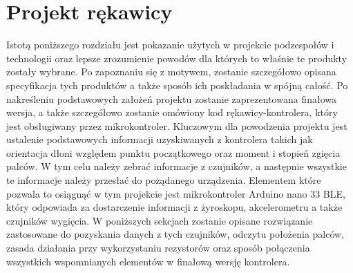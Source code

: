 \chapter{Projekt rękawicy}
\label{ch:projekt}
Istotą poniższego rozdziału jest pokazanie użytych w projekcie podzespołów i technologii oraz lepsze zrozumienie powodów dla których to właśnie te produkty zostały wybrane. Po zapoznaniu się z motywem, zostanie szczegółowo opisana specyfikacja tych produktów a także sposób ich poskładania w spójną całość. Po nakreśleniu podstawowych założeń projektu zostanie zaprezentowana finałowa wersja, a także szczegółowo zostanie omówiony kod rękawicy-kontrolera, który jest obsługiwany przez mikrokontroler. Kluczowym dla powodzenia projektu jest ustalenie podstawowych informacji uzyskiwanych z kontrolera takich jak orientacja dłoni względem punktu początkowego oraz moment i stopień zgięcia palców. W tym celu należy zebrać informacje z czujników, a następnie wszystkie te informacje należy przesłać do pożądanego urządzenia. Elementem które pozwala to osiągnąć w tym projekcie jest mikrokontroler Arduino nano 33 BLE, który odpowiada za dostarczenie informacji z żyroskopu, akcelerometru a także czujników wygięcia. W poniższych sekcjach zostanie opisane rozwiązanie zastosowane do pozyskania danych z tych czujników, odczytu położenia palców, zasada działania przy wykorzystaniu rezystorów oraz sposób połączenia wszystkich wspomnianych elementów w finałową wersję kontrolera.
	
	
